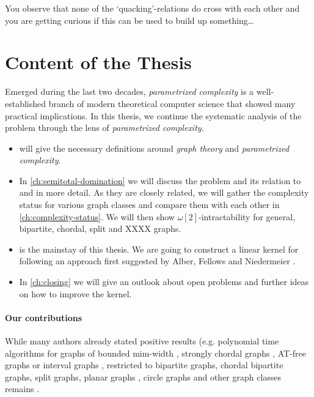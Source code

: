 You observe that none of the `quacking'-relations do cross with each other and you are getting curious if this can be used to build up something\ldots

\section{Content of the Thesis}

Emerged during the last two decades, \textit{parametrized complexity} is a well-established branch of modern theoretical computer science that showed many practical implications. 
In this thesis, we continue the systematic analysis of the \sdom problem through the lens of \textit{parametrized complexity}. 

\begin{itemize}
    \item {} will give the necessary definitions around \textit{graph theory} and \textit{parametrized complexity}.
    \item In \cref{ch:semitotal-domination} we will discuss the \sdom problem and its relation to \dom and \tdom in more detail. As they are closely related, we will gather the complexity status for various graph classes and compare them with each other in \cref{ch:complexity-status}. We will then show $\omega[2]$-intractability for general, bipartite, chordal, split and XXXX graphs.
    \item {} is the mainstay of this thesis. We are going to construct a linear kernel for \psdom following an approach first suggested by Alber, Fellows and Niedermeier \cite{Alber2004}. 
    \item In \cref{ch:closing} we will give an outlook about open problems and further ideas on how to improve the kernel.

\end{itemize}

\paragraph{Our contributions}

While many authors already stated positive results (e.g. polynomial time algorithms for graphs of bounded mim-width \cite{Galby2020}, strongly chordal graphs \cite{Tripathi2021}, AT-free graphs \cite{Kloks2021} or interval graphs \cite{Henning2019}, \sdom restricted to bipartite graphs, chordal bipartite graphs, split graphs, planar graphs \cite{Henning2019}, circle graphs \cite{Kloks2021} and other graph classes remains \NPc.


